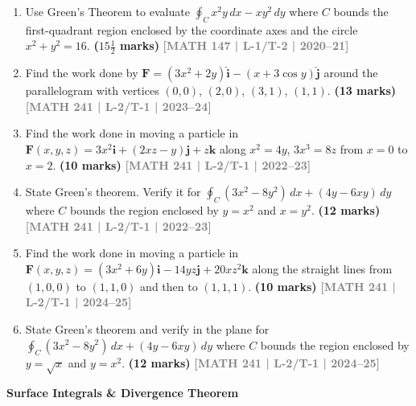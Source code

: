 \documentclass[12pt,a4paper]{article}
\newcommand{\yr}[1]{\hfill\textcolor{gray}{\small\textbf{[#1]}}}
\newcommand{\mk}[1]{\textcolor{orange!70!black}{\small\textbf{(#1 marks)}}}
\newcommand{\subtopic}[2]{%
  \vspace{10pt}
  \noindent\begin{tcolorbox}[colback=#1!8,colframe=#1,boxrule=0.6pt,arc=4pt,
    left=6pt,right=6pt,top=4pt,bottom=4pt]
    \small\bfseries\textcolor{#1}{#2}
  \end{tcolorbox}
  \vspace{2pt}
}
\begin{document}
\begin{enumerate}
\item Use Green's Theorem to evaluate $\displaystyle\oint_{C}x^{2}y\,dx-xy^{2}\,dy$ where $C$ bounds the first-quadrant region enclosed by the coordinate axes and the circle $x^{2}+y^{2}=16$.
\mk{$15\tfrac{1}{2}$} \yr{MATH 147 | L-1/T-2 | 2020--21}

\item Find the work done by $\mathbf{F}=(3x^{2}+2y)\hat{\mathbf{i}}-(x+3\cos y)\hat{\mathbf{j}}$ around the parallelogram with vertices $(0,0)$, $(2,0)$, $(3,1)$, $(1,1)$.
\mk{13} \yr{MATH 241 | L-2/T-1 | 2023--24}

\item Find the work done in moving a particle in $\mathbf{F}(x,y,z)=3x^{2}\mathbf{i}+(2xz-y)\mathbf{j}+z\mathbf{k}$ along $x^{2}=4y$, $3x^{3}=8z$ from $x=0$ to $x=2$.
\mk{10} \yr{MATH 241 | L-2/T-1 | 2022--23}

\item State Green's theorem. Verify it for $\displaystyle\oint_{C}(3x^{2}-8y^{2})\,dx+(4y-6xy)\,dy$ where $C$ bounds the region enclosed by $y=x^{2}$ and $x=y^{2}$.
\mk{12} \yr{MATH 241 | L-2/T-1 | 2022--23}

\item Find the work done in moving a particle in $\mathbf{F}(x,y,z)=(3x^{2}+6y)\mathbf{i}-14yz\mathbf{j}+20xz^{2}\mathbf{k}$ along the straight lines from $(1,0,0)$ to $(1,1,0)$ and then to $(1,1,1)$.
\mk{10} \yr{MATH 241 | L-2/T-1 | 2024--25}

\item State Green's theorem and verify in the plane for $\displaystyle\oint_{C}(3x^{2}-8y^{2})\,dx+(4y-6xy)\,dy$ where $C$ bounds the region enclosed by $y=\sqrt{x}$ and $y=x^{2}$.
\mk{12} \yr{MATH 241 | L-2/T-1 | 2024--25}

\end{enumerate}

\subtopic{cD}{Surface Integrals \& Divergence Theorem}
\label{sub:s4-surface}
\end{document}
